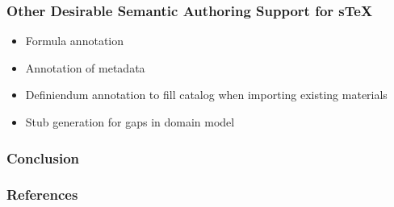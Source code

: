 \documentclass[aspectratio=169]{beamer}
\begin{document}
\begin{frame}
    \frametitle{Other Desirable Semantic Authoring Support for sTeX}
    \begin{itemize}
        \item Formula annotation 
        \item Annotation of metadata 
        \item Definiendum annotation to fill catalog when importing existing materials 
        \item Stub generation for gaps in domain model
    \end{itemize}
\end{frame}

\begin{frame}
    \frametitle{Conclusion}
\end{frame}

\begin{frame}[allowframebreaks,t]
    \frametitle{References}
    \printbibliography
\end{frame}
\end{document}

